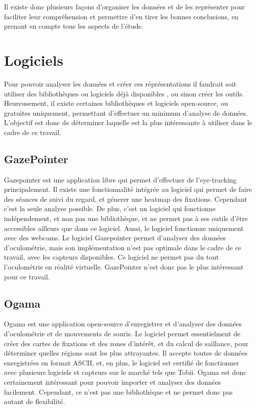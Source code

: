 \documentclass[12pt]{article}
\begin{document}
\bigskip
Il existe donc plusieurs façons d'organiser les données et de les représenter
pour faciliter leur compréhension et permettre d'en tirer les bonnes
conclusions, en prenant en compte tous les aspects de l'étude.


\section{Logiciels}

Pour pouvoir analyser les données et créer ces réprésentations il faudrait soit
utiliser des bibliothèques ou logiciels déjà disponibles
\cite{imotions:software}, ou sinon créer les outils. Heureusement, il existe
certaines bibliothèques et logiciels open-source, ou gratuites uniquement,
permettant d'effectuer un minimum d'analyse de données. L'objectif est donc de
déterminer laquelle est la plus intéressante à utiliser dans le cadre de ce
travail.

\subsection{GazePointer}

Gazepointer \cite{gazepointer} est une application libre qui permet d'effectuer
de l'eye-tracking principalement. Il existe une fonctionnalité intégrée au
logiciel qui permet de faire des séances de suivi du regard, et génerer une
heatmap des fixations. Cependant c'est la seule analyse possible. De plus,
c'est un logiciel qui fonctionne indépendement, et non pas une bibliothèque, et
ne permet pas à ses outils d'être accessibles ailleurs que dans ce logiciel.
Aussi, le logiciel fonctionne uniquement avec des webcams. Le logiciel
Gazepointer permet d'analyser des données d'oculométrie, mais son
implémentation n'est pas optimale dans le cadre de ce travail, avec les
capteurs disponibles. Ce logiciel ne permet pas du tout l'oculométrie en
réalité virtuelle. GazePointer n'est donc pas le plus intéressant pour ce
travail.

\subsection{Ogama}

Ogama \cite{ogama} est une application open-source d'enregistrer et d'analyser 
des données d'oculométrie et de mouvements de souris. Le logiciel permet 
essentielment de créer des cartes de fixations et des zones d'intérêt, et du
calcul de saillance, pour déterminer quelles régions sont les plus attrayantes.
Il accepte toutes de données enregistrées en format ASCII, et, en plus, le
logiciel est certifié de fonctionner avec plusieurs logiciels et capteurs sur le
marché tels que Tobii. Ogama est donc certainement intéressant pour pouvoir
importer et analyser des données facilement. Cependant, ce n'est pas une
bibliothèque et ne permet donc pas autant de flexibilité.
\end{document}
